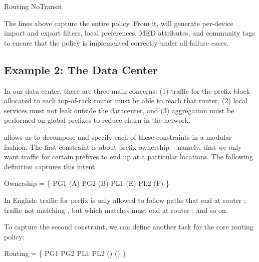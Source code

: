 
\begin{code}
Routing \AND{} NoTransit
\end{code}

\noindent
The lines above capture the entire policy. From it, \sysname will generate per-device import and export filters, local preferences,
MED attributes, and community tags to ensure that the policy is
implemented correctly under all failure cases.

\subsection{Example 2: The Data Center}

In our data center,
there are three main concerns:
(1) traffic for the prefix block allocated to each top-of-rack router must be able to reach that router,
(2) local services must not leak outside the datacenter, and
(3) aggregation must be performed on global prefixes to reduce churn
in the network.

\sysname allows us to decompose and specify each of these constraints in a modular fashion. The first constraint is about prefix ownership -- namely, that we only want traffic for certain prefixes to end up at a particular locations. The following definition captures this intent.


\begin{code}
\Define Ownership = \{
    PG1 \Path \End(A)
    PG2 \Path \End(B)
    PL1 \Path \End(E)
    PL2 \Path \End(F)
\}
\end{code}
\noindent
In English: traffic for prefix  is only allowed to follow paths that
end at router ; traffic not matching , 
but which matches  must
end at router ; and so on.

To capture the second constraint, we can define another task for the core
routing policy:

\begin{code}
\Define Routing = \{
    PG1 \OR PG2 \Path \Any 
    PL1 \OR PL2 \Path \NOT{}\Enter(\Out)
    \True      \Path \Exit(\Out)
\}
\end{code}

